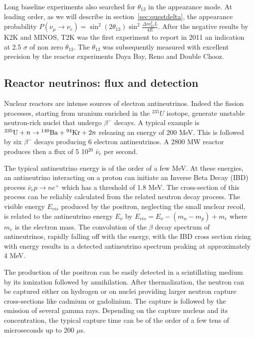 Long baseline experiments also searched for $\theta_{13}$ in the appearance mode. At leading order, as we will describe in section~\ref{sec:questdelta}, the appearance probability $P(\nu_\mu \rightarrow \nu_e) = \sin^2 (2 \theta_{13}) \sin^2 \frac {\Delta m^2_{31} L}{4E}$. After the negative results by K2K and MINOS, T2K was the first experiment to report in 2011 an indication at 2.5 $\sigma$ of non zero $\theta_{13}$. The $\theta_{13}$ was subsequently measured with excellent precision by the reactor experiments Daya Bay, Reno and Double Chooz.


\subsection{Reactor neutrinos: flux and detection}
\label{subsec:reactorflux}
Nuclear reactors are intense sources of electron antineutrinos. Indeed the fission processes, starting from uranium enriched in the $^{235}U$ isotope, generate unstable neutron-rich nuclei that undergo $\beta^-$ decays. A typical example is $ {}^{235}{\rm U} + n \rightarrow {}^{140}{\rm Ba} + {}^{94}{\rm Kr} + 2n$ releasing an energy of 200 MeV. This is followed by six $\beta^-$ decays producing 6 electron antineutrinos. A 2800 MW reactor produces then a flux of 5 10$^{20}$ $\bar{\nu}_e$ per second. 
% 

The typical antineutrino energy is of the order of a few MeV. 
At these energies, an antineutrino interacting on a proton can initiate an Inverse Beta Decay (IBD) process $\bar{\nu}_e p \rightarrow n e^+$ which has a threshold of 1.8 MeV. The cross-section of this process can be reliably calculated from the related neutron decay process. The visible energy $E_{vis}$ produced by the positron, neglecting the small nuclear recoil, is related to the antineutrino energy $E_\nu$ by $E_{vis} =  E_{\nu} -(m_n - m_p) + m_e$ where $m_e$ is the electron mass. The convolution of the $\beta$ decay spectrum of antineutrinos, rapidly falling off with the energy, with the IBD cross section rising with energy results in a detected antineutrino spectrum peaking at approximately 4 MeV. 

The production of the positron can be easily detected in a scintillating medium by its ionization followed by annihilation. After thermalization, the neutron can be captured either on hydrogen or on nuclei providing larger neutron capture cross-sections like cadmium or gadolinium. The capture is followed by the emission of several gamma rays. Depending on the capture nucleus and its concentration, the typical capture time can be of the order of a few tens of microseconds up to 200 $\mu $s.

